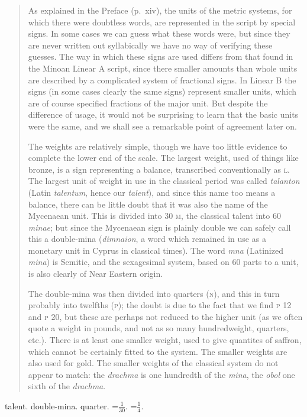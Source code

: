 \documentclass{article}
\begin{document}
\begin{quote}
As explained in the Preface (p.~xiv), the units of the metric
systems, for which there were doubtless words, are represented in the
script by special signs. In some cases we can guess what these words were,
but since they are never written out syllabically we have no way of verifying
these guesses. The way in which these signs are used differs from that
found in the Minoan Linear A script, since there smaller amounts than
whole units are described by a complicated system of fractional signs. In
Linear B the signs (in some cases clearly the same signs) represent smaller
units, which are of course specified fractions of the major unit. But despite
the difference of usage, it would not be surprising to learn that the basic
units were the same, and we shall see a remarkable point of agreement
later on.

The weights are relatively simple, though we have too little evidence to
complete the lower end of the scale. The largest weight, used of things like
bronze, is a sign representing a balance, transcribed conventionally as \textsc{l}.
The largest unit of weight in use in the classical period was
called {\em talanton} (Latin {\em talentum}, hence our {\em talent}), and since this name too
means a balance, there can be little doubt that it was also the name of the
Mycenaean unit. This is divided into 30 \textsc{m}, the classical talent into 60 {\em minae};
but since the Mycenaean sign is plainly double we can safely call this a 
double-mina ({\em dimnaion}, a word which remained in use as a monetary unit
in Cyprus in classical times). The word {\em mna} (Latinized {\em mina}) is Semitic,
and the sexagesimal system, based on 60 parts to a unit, is also clearly
of Near Eastern origin.

The double-mina was then divided into quarters (\textsc{n}), and this in turn
probably into twelfths (\textsc{p}); the doubt is due to the fact that we find \textsc{p} 12
and \textsc{p} 20, but these are perhaps not reduced to the higher unit (as we often
quote a weight in pounds, and not as so many hundredweight, quarters,
etc.). There is at least one smaller weight, used to give quantites of saffron,
which cannot be certainly fitted to the system. The smaller weights are also
used for gold. The smaller weights of the classical system do not appear to
match: the {\em drachma} is one hundredth of the {\em mina}, the {\em obol} one sixth of the
{\em drachma}.
\end{quote}

\textlinb{\BPtalent} talent.
\textlinb{\BPwtd} double-mina.
\textlinb{\BPwtc} quarter.
 \textlinb{\BPwtd} =$\frac{1}{30}$\textlinb{\BPtalent}.
\textlinb{\BPwtc} =$\frac{1}{4}$\textlinb{\BPwtd}.
\end{document}
